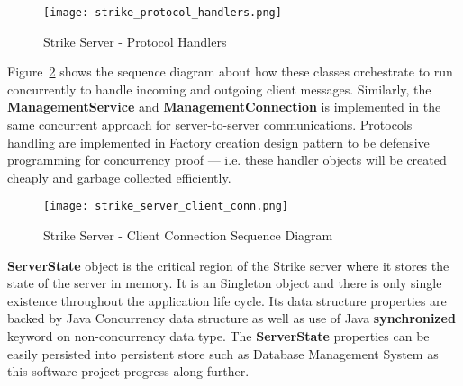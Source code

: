\documentclass[dareport.tex]{subfiles}
\begin{document}
\begin{figure}[h]
\texttt{[image: strike\_protocol\_handlers.png]}
\centering
\caption{Strike Server - Protocol Handlers}
\label{fig:protohdl}
\centering
\end{figure}

Figure~\ref{fig:clientsq} shows the sequence diagram about how these classes orchestrate to run concurrently to handle incoming and outgoing client messages. Similarly, the \textbf{ManagementService} and \textbf{ManagementConnection} is implemented in the same concurrent approach for server-to-server communications. Protocols handling are implemented in Factory creation design pattern to be defensive programming for concurrency proof --- i.e. these handler objects will be created cheaply and garbage collected efficiently.

\begin{figure}[h]
\texttt{[image: strike\_server\_client\_conn.png]}
\caption{Strike Server - Client Connection Sequence Diagram}
\label{fig:clientsq}
\centering
\end{figure}

\textbf{ServerState} object is the critical region of the Strike server where it stores the state of the server in memory. It is an Singleton object and there is only single existence throughout the application life cycle. Its data structure properties are backed by Java Concurrency data structure as well as use of Java \textbf{synchronized} keyword on non-concurrency data type. The \textbf{ServerState} properties can be easily persisted into persistent store such as Database Management System as this software project progress along further.
\end{document}
